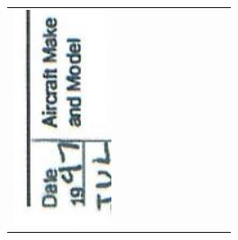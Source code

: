 \documentclass[10pt]{article}
\begin{document}
\begin{center}
\begin{tabular}{|c|c|c|c|c|c|c|c|c|c|}
\hline
\includegraphics[max width=\textwidth]{2025_02_27_dd68c3d38de88f0516d9g-053(3)}

\end{tabular}
\end{center}
\end{document}
